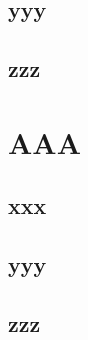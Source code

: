 \documentclass[theme = color]{main}
\begin{document}
\subsection{yyy}
\subsection{zzz}

\section{AAA}
\subsection{xxx}
\subsection{yyy}
\subsection{zzz}
\end{document}

